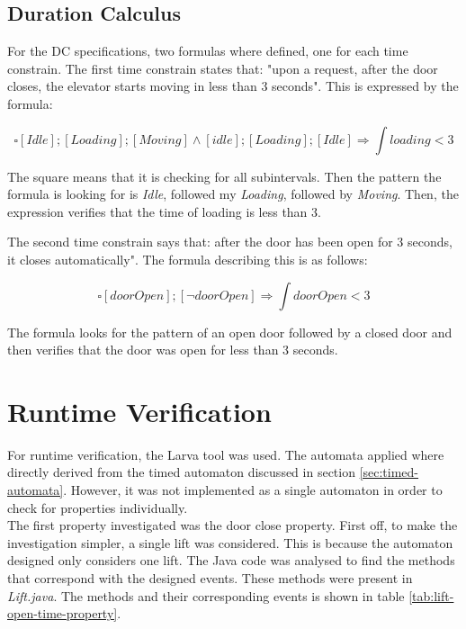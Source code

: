 \documentclass[a4paper, 12pt]{article}
\begin{document}
\subsection{Duration Calculus}
For the DC specifications, two formulas where defined, one for each time constrain. The first time constrain states that: "upon a request, after the door closes, the elevator starts moving in less than 3 seconds". This is expressed by the formula:

$$\square [Idle] ; [Loading] ;  [Moving]  \wedge [idle] ; [Loading] ; [Idle] \Rightarrow \int loading < 3$$

The square means that it is checking for all subintervals. Then the pattern the formula is looking for is \textit{Idle}, followed my \textit{Loading}, followed by \textit{Moving}. Then, the expression verifies that the time of loading is less than 3.

The second time constrain says that: after the door has been open for 3 seconds, it closes automatically". The formula describing this is as follows:

$$\square [doorOpen] ; [\neg doorOpen] \Rightarrow \int doorOpen < 3$$

The formula looks for the pattern of an open door followed by a closed door and then verifies that the door was open for less than 3 seconds. 

\section{Runtime Verification}

For runtime verification, the Larva tool was used. The automata applied where directly derived from the timed automaton discussed in section \ref{sec:timed-automata}. However, it was not implemented as a single automaton in order to check for properties individually. \\

The first property investigated was the door close property. First off, to make the investigation simpler, a single lift was considered. This is because the automaton designed only considers one lift. The Java code was analysed to find the methods that correspond with the designed events. These methods were present in \textit{Lift.java}. The methods and their corresponding events is shown in table \ref{tab:lift-open-time-property}.
\end{document}
